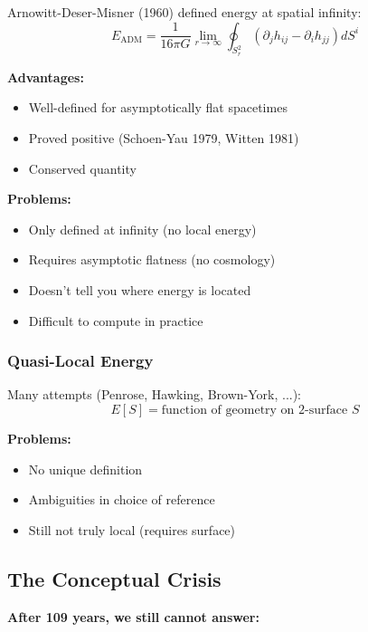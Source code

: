 \documentclass[11pt,a4paper]{article}
\theoremstyle{definition}
\theoremstyle{remark}
\begin{document}
	Arnowitt-Deser-Misner (1960) defined energy at spatial infinity:
	\begin{equation}
		E_{\text{ADM}} = \frac{1}{16\pi G}\lim_{r\to\infty}\oint_{S^2_r}(\partial_j h_{ij} - \partial_i h_{jj})dS^i
	\end{equation}
	
	\textbf{Advantages:}
	\begin{itemize}
		\item Well-defined for asymptotically flat spacetimes
		\item Proved positive (Schoen-Yau 1979, Witten 1981)
		\item Conserved quantity
	\end{itemize}
	
	\textbf{Problems:}
	\begin{itemize}
		\item Only defined at infinity (no local energy)
		\item Requires asymptotic flatness (no cosmology)
		\item Doesn't tell you where energy is located
		\item Difficult to compute in practice
	\end{itemize}
	
	\subsubsection{Quasi-Local Energy}
	
	Many attempts (Penrose, Hawking, Brown-York, ...):
	\begin{equation}
		E[S] = \text{function of geometry on 2-surface } S
	\end{equation}
	
	\textbf{Problems:}
	\begin{itemize}
		\item No unique definition
		\item Ambiguities in choice of reference
		\item Still not truly local (requires surface)
	\end{itemize}
	
	\subsection{The Conceptual Crisis}
	
	\begin{center}
		\textbf{After 109 years, we still cannot answer:}
		
	\end{center}
	
\end{document}
